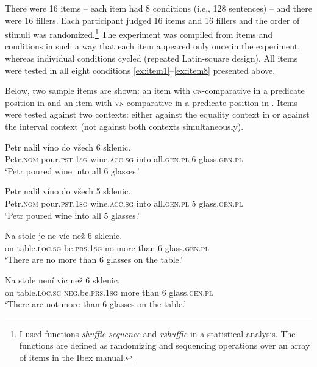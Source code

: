 \documentclass[output=paper,
]{langscibook}
\begin{document}
\noindent There were 16 items -- each item had 8 conditions (i.e., 128 sentences) -- and there were 16 fillers. Each participant judged 16 items and 16 fillers and the order of stimuli was randomized.\footnote{I used functions \textit{shuffle sequence} and \textit{rshuffle} in a statistical analysis. The functions are defined as randomizing and sequencing operations over an array of items in the Ibex manual.} The experiment was compiled from items and conditions in such a way that each item appeared only once in the experiment, whereas individual conditions cycled (repeated Latin-square design). All items were tested in all eight conditions \ref{ex:item1}--\ref{ex:item8} presented above. 

Below, two sample items are shown: an item with \textsc{cn-}comparative in a predicate position in  and an item with \textsc{vn-}comparative in a predicate position in . Items were tested against two contexts: either against the equality context in  or against the interval context  (not against both contexts simultaneously).


\ea 
\gll Petr nalil víno do všech 6 sklenic.\\
Petr.\textsc{nom} pour.\textsc{pst.1sg} wine.\textsc{acc.sg} into all.\textsc{gen.pl} 6 glass.\textsc{gen.pl}\\\hfill{}
\glt `Petr poured wine into all 6 glasses.' \label{ex:wine_e}
\z


\ea  
\gll Petr nalil víno do všech 5 sklenic.\\
Petr.\textsc{nom} pour.\textsc{pst.1sg} wine.\textsc{acc.sg} into all.\textsc{gen.pl} 5 glass.\textsc{gen.pl}\\\hfill{}
\glt `Petr poured wine into all 5 glasses.' \label{ex:wine_n}
\z

\ea 
\gll Na stole je ne víc než 6 sklenic.\label{ex:pcn}\\
on table.\textsc{loc.sg} be.\textsc{prs.1sg} no more than 6 glass.\textsc{gen.pl}\\\hfill {}
\glt `There are no more than 6 glasses on the table.'
\z

\ea
\gll Na stole není víc než 6 sklenic.\label{ex:pvn}\\
on table.\textsc{loc.sg} \textsc{neg}.be.\textsc{prs.1sg} more than 6 glass.\textsc{gen.pl}\\\hfill {}
\glt `There are not more than 6 glasses on the table.'
\z
\end{document}
